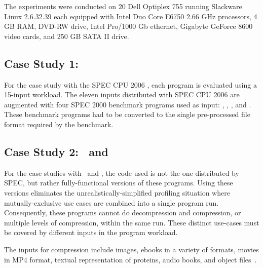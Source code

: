 
The experiments were conducted on $20$ Dell Optiplex 755 running Slackware Linux 2.6.32.39 each equipped with Intel Duo Core E6750 2.66 GHz processors, 4 GB RAM, DVD-RW drive, Intel Pro/1000 Gb ethernet, Gigabyte GeForce 8600 video cards, and 250 GB SATA II drive. 

\subsection {Case Study 1: \gcc}

For the case study with the SPEC CPU 2006  \gcc, each program is evaluated using a 15-input workload. The eleven inputs distributed with SPEC CPU 2006 are augmented with  four SPEC 2000 benchmark programs used as input: \bzip, \lbm, \mcf, and \parser. These benchmark programs had to be converted to the single pre-processed file format required by the \gcc benchmark. 

\subsection {Case Study 2: \bzip\  and \gzip}

For the case studies with \bzip\ and \gzip, the code used is not the one distributed by SPEC, but rather fully-functional versions of these programs. Using these versions eliminates the unrealistically-simplified profiling situation where mutually-exclusive use cases are combined into a single program run. Consequently, these programs cannot do decompression and compression, or multiple levels of compression, within the same run.  These distinct use-cases must be covered by different inputs in the program workload.

The inputs for compression include images, ebooks in a variety of formats, movies in MP4 format, textual representation of proteins, audio books, and object files~\cite{BerubePhD}.

